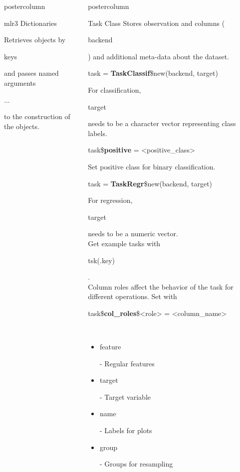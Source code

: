\documentclass{beamer}
\newlength{\columnheight} %
\newcommand{\codeinline}[1]{\begin{codeboxinline}#1\end{codeboxinline}}
\begin{document}
\begin{frame}[fragile]{}
\begin{columns}
\begin{column}{.245\textwidth}
\begin{beamercolorbox}[center]{postercolumn}
\begin{minipage}{.98\textwidth}
{\begin{myblock}{mlr3 Dictionaries}
\begin{codebox}
							\end{codebox}
							Retrieves objects by \codeinline{keys} and 
							passes named arguments \codeinline{...} to the construction of the objects. 
						\end{myblock}
					}
				\end{minipage}
			\end{beamercolorbox}
		\end{column}
		\begin{column}{.245\textwidth}
			\begin{beamercolorbox}[center]{postercolumn}
				\begin{minipage}{.98\textwidth}
					\parbox[t][\columnheight]{\textwidth}{
					\begin{myblock}{Task Class}
						Stores observation and columns (\codeinline{backend}) and additional
						meta-data about the dataset.
						\\
						\begin{codebox}
							task = \textbf{TaskClassif}\$new(backend, target)
						\end{codebox}
						For classification, \codeinline{target} needs to be a character vector representing class labels.
						\\
						\begin{codebox}
							task\$\textbf{positive} = <positive\_class>
						\end{codebox}
						Set positive class for binary classification.
						\\
						\begin{codebox}
							task = \textbf{TaskRegr}\$new(backend, target)
						\end{codebox}
						For regression, \codeinline{target} needs to be a numeric vector.
						\\
                        Get example tasks with \codeinline{tsk(.key)}.
						\vspace{1em}
						\\
						Column roles affect the behavior of the task for different operations. Set with \codeinline{task\$\textbf{col\_roles}\$<role> = <column\_name>}
						\\
						\begin{itemize}
							\item \codeinline{feature} - Regular features
							\item \codeinline{target} - Target variable
							\item \codeinline{name} - Labels for plots
							\item \codeinline{group} -  Groups for resampling

\end{itemize}
\end{myblock}}
\end{minipage}
\end{beamercolorbox}
\end{column}
\end{columns}
\end{frame}
\end{document}
